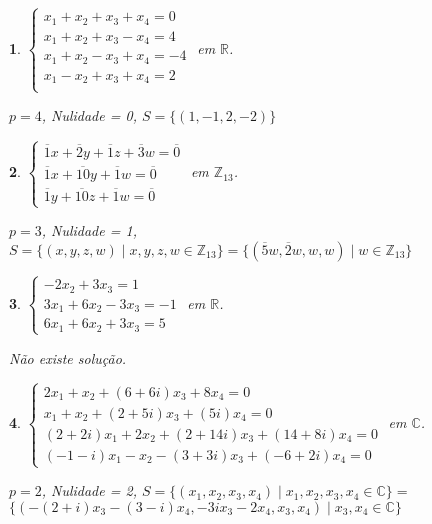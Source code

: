 \documentclass[12pt]{exam}
\newtheorem{exercicio}{}
\newcommand{\integer}{\mathbb{Z}}
\newcommand{\real}{\mathbb{R}}
\newcommand{\complex}{\mathbb{C}}
\begin{document}
\begin{exercicio}
$\begin{cases}
  x_1 + x_2 + x_3 + x_4 = 0\\
  x_1 + x_2 + x_3 - x_4 = 4\\
  x_1 + x_2 - x_3 + x_4 = -4\\
  x_1 - x_2 + x_3 + x_4 = 2\\
\end{cases}$ em $\real$.
\begin{solucao}
  $p = 4$, Nulidade = 0, $S = \{(1, -1, 2, -2)\}$
\end{solucao}
\end{exercicio}

\begin{exercicio}
$\begin{cases}
  \overline{1}x + \overline{2}y + \overline{1}z + \overline{3}w = \overline{0}\\
  \overline{1}x + \overline{10}y + \overline{1}w = \overline{0}\\
  \overline{1}y + \overline{10}z + \overline{1}w = \overline{0}
\end{cases}$ em $\integer_{13}$.
\begin{solucao}
  $p = 3$, Nulidade = 1, $S = \{(x, y, z, w) \mid x, y, z, w \in \integer_{13}\} = \{(\overline{5}w, \overline{2}w,w, w) \mid w \in \integer_{13}\}$
\end{solucao}
\end{exercicio}

\begin{exercicio}
  $\begin{cases}
    -2x_2 + 3x_3 = 1\\
    3x_1 + 6x_2 - 3x_3 = -1\\
    6x_1 + 6x_2 + 3x_3 = 5
  \end{cases}$ em $\real$.
  \begin{solucao}
    N\~ao existe solu\c{c}\~ao.
  \end{solucao}
\end{exercicio}

\begin{exercicio}
  $\begin{cases}
    2x_1 + x_2 + (6 + 6i)x_3 + 8x_4 = 0\\
    x_1 + x_2 + (2 + 5i)x_3 + (5  i)x_4 = 0\\
    (2 + 2i)x_1 + 2x_2 + (2 + 14i)x_3 + (14 + 8i)x_4 =0\\
    (-1 - i)x_1 - x_2 - (3 + 3i)x_3 + (-6 + 2i)x_4 = 0
  \end{cases}$ em $\complex$.
  \begin{solucao}
    $p = 2$, Nulidade = 2, $S = \{(x_1, x_2, x_3, x_4) \mid x_1, x_2, x_3, x_4 \in \complex\} = $\\ $\{(-(2 + i)x_3 - (3 - i)x_4,-3ix_3 - 2x_4, x_3, x_4) \mid x_3, x_4 \in \complex\}$
  \end{solucao}
\end{exercicio}
\end{document}
